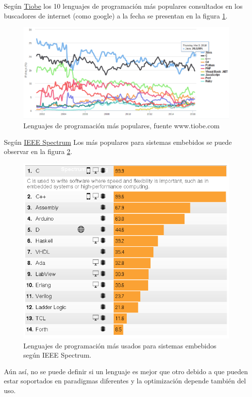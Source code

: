 \documentclass{article}
\begin{document}
Según \href{http://www.tiobe.com/tiobe_index?page=index}{Tiobe} los 10
lenguajes de programación más populares consultados en los buscadores
de internet (como google) a la fecha se presentan en la figura \ref{fig:lenguajes1}.

\begin{figure}[hptp]
    \centering
    \includegraphics[scale=0.4]{imag/lenguajes1.png}
    \caption{Lenguajes de programación más populares, fuente www.tiobe.com}
    \label{fig:lenguajes1}
\end{figure}
\smallskip

Según \href{spectrum.ieee.org}{IEEE Spectrum} Los más populares para
sistemas embebidos se puede observar en la figura \ref{fig:lenguajes2}.

\begin{figure}[hptp]
    \centering
    \includegraphics[scale=0.4]{imag/lenguajes2.png}
    \caption{Lenguajes de programación más usados para sistemas
	embebidos según IEEE Spectrum.}
    \label{fig:lenguajes2}
\end{figure}
\smallskip

Aún así, no se puede definir si un lenguaje es mejor que otro debido a que
pueden estar soportados en paradigmas diferentes y la optimización depende
también del uso.
\end{document}
